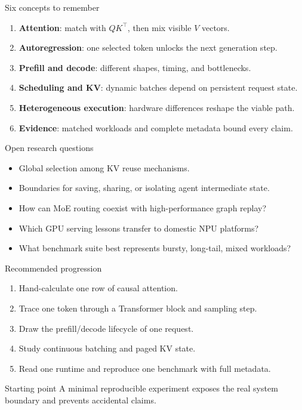 \documentclass[aspectratio=169,11pt]{beamer}
\newcommand{\term}[1]{\textcolor{HUSTBlue}{\textbf{#1}}}
\begin{document}

\begin{frame}{Six concepts to remember}
  \begin{enumerate}
    \item \term{Attention}: match with \(QK^\top\), then mix visible \(V\) vectors.
    \item \term{Autoregression}: one selected token unlocks the next generation step.
    \item \term{Prefill and decode}: different shapes, timing, and bottlenecks.
    \item \term{Scheduling and KV}: dynamic batches depend on persistent request state.
    \item \term{Heterogeneous execution}: hardware differences reshape the viable path.
    \item \term{Evidence}: matched workloads and complete metadata bound every claim.
  \end{enumerate}
\end{frame}

\iffalse %
\begin{frame}{Open research questions}
  \begin{itemize}
    \item Global selection among KV reuse mechanisms.
    \item Boundaries for saving, sharing, or isolating agent intermediate state.
    \item How can MoE routing coexist with high-performance graph replay?
    \item Which GPU serving lessons transfer to domestic NPU platforms?
    \item What benchmark suite best represents bursty, long-tail, mixed workloads?
  \end{itemize}
\end{frame}

\begin{frame}{Recommended progression}
  \begin{enumerate}
    \item Hand-calculate one row of causal attention.
    \item Trace one token through a Transformer block and sampling step.
    \item Draw the prefill/decode lifecycle of one request.
    \item Study continuous batching and paged KV state.
    \item Read one runtime and reproduce one benchmark with full metadata.
  \end{enumerate}
  \vspace{0.3cm}
  \begin{block}{Starting point}
    A minimal reproducible experiment exposes the real system boundary and prevents accidental claims.
  \end{block}
\end{frame}
\end{document}
